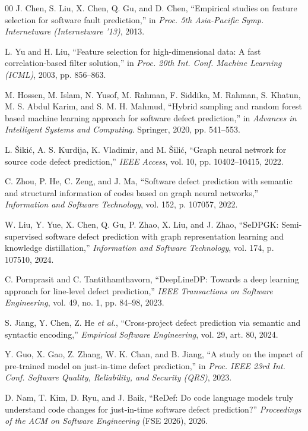 \documentclass[conference,a4paper]{IEEEtran}
\begin{document}
\begin{thebibliography}{00}
 J. Chen, S. Liu, X. Chen, Q. Gu, and D. Chen, ``Empirical studies on feature selection for software fault prediction,'' in \textit{Proc. 5th Asia-Pacific Symp. Internetware (Internetware '13)}, 2013.

 L. Yu and H. Liu, ``Feature selection for high-dimensional data: A fast correlation-based filter solution,'' in \textit{Proc. 20th Int. Conf. Machine Learning (ICML)}, 2003, pp. 856--863.

 M. Hossen, M. Islam, N. Yusof, M. Rahman, F. Siddika, M. Rahman, S. Khatun, M. S. Abdul Karim, and S. M. H. Mahmud, ``Hybrid sampling and random forest based machine learning approach for software defect prediction,'' in \textit{Advances in Intelligent Systems and Computing}. Springer, 2020, pp. 541--553.

 L. {\v S}iki\'c, A. S. Kurdija, K. Vladimir, and M. {\v S}ili\'c, ``Graph neural network for source code defect prediction,'' \textit{IEEE Access}, vol. 10, pp. 10402--10415, 2022.

 C. Zhou, P. He, C. Zeng, and J. Ma, ``Software defect prediction with semantic and structural information of codes based on graph neural networks,'' \textit{Information and Software Technology}, vol. 152, p. 107057, 2022.

 W. Liu, Y. Yue, X. Chen, Q. Gu, P. Zhao, X. Liu, and J. Zhao, ``SeDPGK: Semi-supervised software defect prediction with graph representation learning and knowledge distillation,'' \textit{Information and Software Technology}, vol. 174, p. 107510, 2024.

 C. Pornprasit and C. Tantithamthavorn, ``DeepLineDP: Towards a deep learning approach for line-level defect prediction,'' \textit{IEEE Transactions on Software Engineering}, vol. 49, no. 1, pp. 84--98, 2023.

 S. Jiang, Y. Chen, Z. He \textit{et al.}, ``Cross-project defect prediction via semantic and syntactic encoding,'' \textit{Empirical Software Engineering}, vol. 29, art. 80, 2024.   %

 Y. Guo, X. Gao, Z. Zhang, W. K. Chan, and B. Jiang, ``A study on the impact of pre-trained model on just-in-time defect prediction,'' in \textit{Proc. IEEE 23rd Int. Conf. Software Quality, Reliability, and Security (QRS)}, 2023.   %

 D. Nam, T. Kim, D. Ryu, and J. Baik, ``ReDef: Do code language models truly understand code changes for just-in-time software defect prediction?'' \textit{Proceedings of the ACM on Software Engineering} (FSE 2026), 2026.   %


\end{thebibliography}
\end{document}
